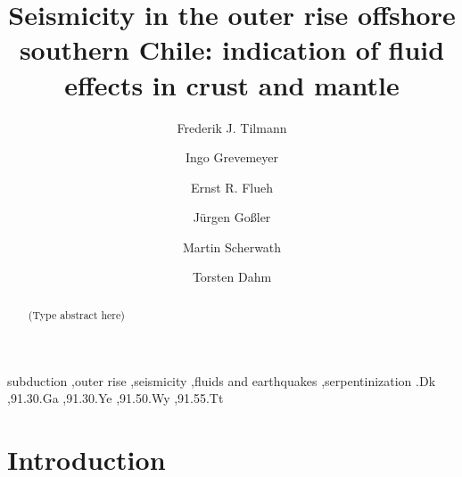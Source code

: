 \documentclass[reviewcopy]{elsarticle}
\begin{document}
\begin{frontmatter}



\title{Seismicity in the outer rise offshore southern Chile:
  indication of fluid effects in crust and mantle}


\author[cam]{Frederik J. Tilmann}
\author[ifm]{Ingo Grevemeyer}
\author[ifm]{Ernst R. Flueh}
\author[ifm]{J\"urgen Go{\ss}ler}
\author[ifm]{Martin Scherwath}
\author[ham]{Torsten Dahm}

\address[cam]{Bullard Laboratories, University of Cambridge,
  Cambridge CB3 0EZ, UK}
\address[ifm]{IfM-GEOMAR, Kiel, Germany}
\address[ham]{Institute for Geophysics, University of Hamburg, Hamburg, Germany}

\begin{abstract}
(Type abstract here)
\end{abstract}

\begin{keyword}
subduction \sep outer rise \sep seismicity \sep fluids and earthquakes \sep serpentinization
.Dk \sep 91.30.Ga \sep 91.30.Ye \sep 91.50.Wy \sep 91.55.Tt
\end{keyword}

\end{frontmatter}

\section{Introduction}
\end{document}
